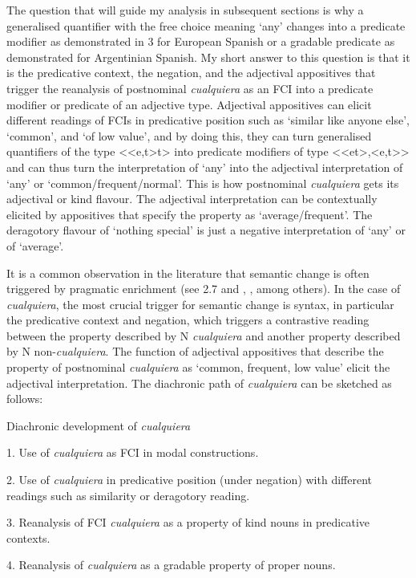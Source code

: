   The question that will guide my analysis in subsequent sections is why a generalised quantifier with the free choice meaning ‘any’ changes into a predicate modifier as demonstrated in 3 for European Spanish or a gradable predicate as demonstrated for Argentinian Spanish. My short answer to this question is that it is the predicative context, the negation, and the adjectival appositives that trigger the reanalysis of postnominal \textit{cualquiera} as an FCI into a predicate modifier or predicate of an adjective type. Adjectival appositives can elicit different readings of FCIs in predicative position such as ‘similar like anyone else’, ‘common’, and ‘of low value’, and by doing this, they can turn generalised quantifiers of the type <<e,t>t> into predicate modifiers of type <<et>,<e,t>> and can thus turn the interpretation of ‘any’ into the adjectival interpretation of ‘any’ or ‘common/frequent/normal’. This is how postnominal \textit{cualquiera} gets its adjectival or kind flavour. The adjectival interpretation can be contextually elicited by appositives that specify the property as ‘average/frequent’. The deragotory flavour of ‘nothing special’ is just a negative interpretation of ‘any’ or of ‘average’.

  It is a common observation in the literature that semantic change is often triggered by pragmatic enrichment (see 2.7 and \citealt{TraugottDasher2002}, \citealt{Eckardt2006}, among others). In the case of \textit{cualquiera}, the most crucial trigger for semantic change is syntax, in particular the predicative context and negation, which triggers a contrastive reading between the property described by N \textit{cualquiera} and another property described by N non-\textit{cualquiera}. The function of adjectival appositives that describe the property of postnominal \textit{cualquiera} as ‘common, frequent, low value’ elicit the adjectival interpretation. The diachronic path of \textit{cualquiera} can be sketched as follows:

  Diachronic development of \textit{cualquiera}

  1.  Use of \textit{cualquiera} as FCI in modal constructions.

  2.  Use of \textit{cualquiera} in predicative position (under negation) with different readings such as similarity or deragotory reading.

  3.  Reanalysis of FCI \textit{cualquiera} as a property of kind nouns in predicative contexts.

  4.  Reanalysis of \textit{cualquiera} as a gradable property of proper nouns.


